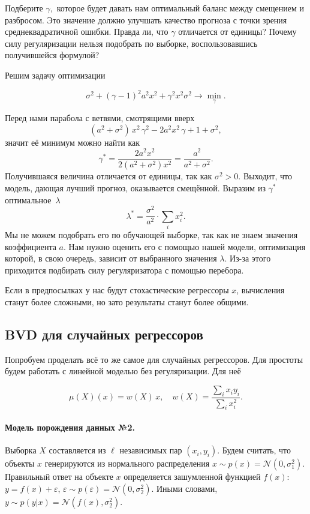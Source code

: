 \documentclass[12pt,fleqn]{article}
\begin{document}
\begin{vkProblem}
    Подберите $\gamma,$ которое будет давать нам оптимальный баланс между смещением и разбросом. Это значение должно улучшать качество прогноза с точки зрения среднеквадратичной ошибки. Правда ли, что $\gamma$ отличается от единицы? Почему силу регуляризации нельзя подобрать по выборке, воспользовавшись получившейся формулой?  
\end{vkProblem}
\begin{esSolution}
    Решим задачу оптимизации 
    
    \[
    \sigma^2 + (\gamma - 1)^2 a^2 x^2 + \gamma^2 x^2 \sigma^2 \to \min_{\gamma}.
    \]
    
    Перед нами парабола с ветвями, смотрящими вверх
    \[ 
    (a^2 + \sigma^2) \, x^2 \, \gamma^2 - 2a^2x^2 \, \gamma + 1 + \sigma^2,
    \]
    значит её минимум можно найти как
    \[
    \gamma^{*} = \frac{2a^2x^2}{2(a^2 + \sigma^2)x^2} = \frac{a^2}{a^2 + \sigma^2}. 
    \]
    Получившаяся величина отличается от единицы, так как $\sigma^2 > 0.$ Выходит, что модель, дающая лучший прогноз, оказывается смещённой. Выразим из $\gamma^{*}$ оптимальное~$\lambda$
    \[
    \lambda^{*} = \frac{\sigma^2}{a^2} \cdot \sum_i x_i^2.
    \]
    Мы не можем подобрать его по обучающей выборке, так как не знаем значения коэффициента $a$. Нам нужно оценить его с помощью нашей модели, оптимизация которой, в свою очередь, зависит от выбранного значения $\lambda.$ Из-за этого приходится подбирать силу регуляризатора с помощью перебора. 
\end{esSolution}

Если в предпосылках у нас будут стохастические регрессоры $x$, вычисления станут более сложными, но зато результаты станут более общими. 

\subsection{BVD для случайных регрессоров}

Попробуем проделать всё то же самое для случайных регрессоров. Для простоты будем работать с линейной моделью без регуляризации. Для неё 

\[
\mu(X)(x) = w(X) \,x, \quad w(X) = \frac{\sum_i x_i y_i}{\sum_i x_i^2}.
\]

\paragraph{Модель порождения данных №2.} Выборка $X$ составляется из $\ell$ независимых пар $(x_i, y_i)$. Будем считать, что объекты $x$ генерируются из нормального распределения $x \sim p(x) = \mathcal{N}(0, \sigma_1^2)$. Правильный ответ на объекте $x$ определяется зашумленной функцией $f(x)$: $y = f(x) + \varepsilon$, $\varepsilon \sim p(\varepsilon) = \mathcal{N}(0, \sigma_2^2)$. Иными словами, $y \sim p(y|x) = \mathcal{N}(f(x), \sigma_2^2)$.
\end{document}
